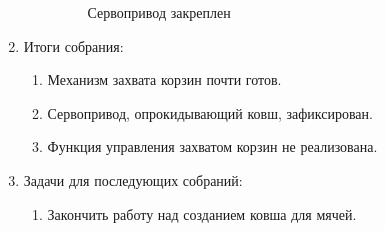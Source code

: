 \begin{enumerate}
\begin{enumerate}
\begin{figure}[H]
\begin{minipage}[h]{0.47\linewidth}
				\caption{Сервопривод закреплен}
			\end{minipage}
		\end{figure}
		
	\end{enumerate}
	
	\item Итоги собрания:
	\begin{enumerate}
		\item Механизм захвата корзин почти готов.
		
		\item Сервопривод, опрокидывающий ковш, зафиксирован.
		
		\item Функция управления захватом корзин не реализована.
		
	\end{enumerate}
	
	\item Задачи для последующих собраний:
	\begin{enumerate}
		\item Закончить работу над созданием ковша для мячей.
		
	\end{enumerate}     
\end{enumerate}
\fillpage

